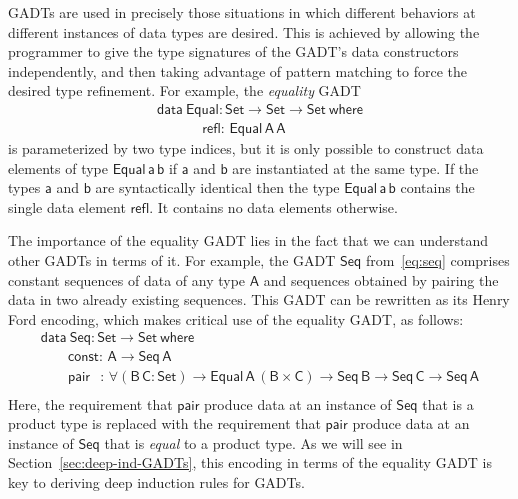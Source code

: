 \documentclass[9pt]{entcs}
\begin{document}
GADTs are used in precisely those situations in which different
behaviors at different instances of data types are desired. This is
achieved by allowing the programmer to give the type signatures of the
GADT's data constructors independently, and then taking advantage of
pattern matching to force the desired type refinement. For example,
the {\em equality} GADT
\begin{equation}\label{eq:equal}
\begin{array}{l}
\mathsf{data\ Equal : Set \to Set \to Set\ where}\\
\mathsf{\;\;\;\;\;\;\;\;\;\;\;\,refl :\, Equal\,A\,A}
\end{array}
\end{equation}
is parameterized by two type indices, but it is only possible to
construct data elements of type $\mathsf{Equal\,a\,b}$ if $\mathsf{a}$
and $\mathsf{b}$ are instantiated at the same type. If the types
$\mathsf{a}$ and $\mathsf{b}$ are syntactically identical then the
type $\mathsf{Equal\,a\,b}$ contains the single data element
$\mathsf{refl}$. It contains no data elements otherwise.

The importance of the equality GADT lies in the fact that we can
understand other GADTs in terms of it. For example, the GADT
$\mathsf{Seq}$ from~\eqref{eq:seq} comprises constant sequences of
data of any type $\mathsf{A}$ and sequences obtained by pairing the
data in two already existing sequences. This GADT can be rewritten as
its Henry Ford encoding, which makes critical use of the equality
GADT, as follows:
\begin{equation}\label{eq:eq_seq}
\begin{array}{l}
\mathsf{data\ Seq : Set \to Set\ where}\\
\mathsf{\;\;\;\;\;\;\;const :\, A \to Seq\,A}\\ 
\mathsf{\;\;\;\;\;\;\;pair\,\;\; :\, \forall (B\,C : Set) \to
  Equal\,A\,(B \times C) \to Seq\,B \to Seq\,C \to Seq\,A}\\ 
\end{array}
\end{equation}
Here, the requirement that $\mathsf{pair}$ produce data at an instance
of $\mathsf{Seq}$ that is a product type is replaced with the
requirement that $\mathsf{pair}$ produce data at an instance of
$\mathsf{Seq}$ that is \emph{equal} to a product type. As we will see
in Section~\ref{sec:deep-ind-GADTs}, this encoding in terms of the
equality GADT is key to deriving deep induction rules for GADTs.
\end{document}
